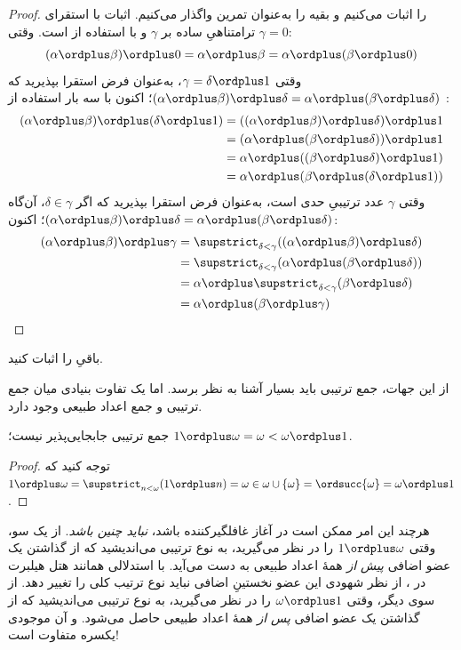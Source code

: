 \documentclass[../../../include/open-logic-section]{subfiles}
\begin{document}
\begin{proof}
 را اثبات می‌کنیم و بقیه را به‌عنوان تمرین
واگذار می‌کنیم. اثبات با استقرای ترامتناهیِ ساده بر $\gamma$ و با
استفاده از  است. وقتی $\gamma = 0$:
\[
(\alpha \ordplus  \beta) \ordplus  0 = \alpha \ordplus  \beta  = \alpha \ordplus  (\beta \ordplus  0)
\]
وقتی $\gamma = \delta\ordplus 1$، به‌عنوان فرض استقرا بپذیرید که
$(\alpha \ordplus \beta) \ordplus \delta =
\alpha \ordplus (\beta \ordplus \delta)$؛ اکنون با سه بار استفاده
از :
\begin{align*}
	(\alpha \ordplus  \beta) \ordplus  (\delta \ordplus  1) & = ((\alpha \ordplus  \beta) \ordplus  \delta)\ordplus 1\\
	& = (\alpha \ordplus  (\beta \ordplus  \delta)) \ordplus  1\\
	& = \alpha \ordplus  ((\beta \ordplus  \delta)\ordplus 1)\\
	& = \alpha \ordplus  (\beta \ordplus  (\delta\ordplus 1))
\end{align*}
وقتی $\gamma$ عدد ترتیبیِ حدی است، به‌عنوان فرض استقرا بپذیرید که
اگر $\delta \in \gamma$، آن‌گاه
$(\alpha \ordplus \beta) \ordplus \delta =
\alpha \ordplus (\beta \ordplus \delta)$؛ اکنون:
\begin{align*}
	(\alpha \ordplus  \beta) \ordplus  \gamma & = \supstrict_{\delta < \gamma}((\alpha \ordplus  \beta) \ordplus  \delta) \\
	&= \supstrict_{\delta < \gamma}(\alpha \ordplus  (\beta \ordplus  \delta))\\
	&= \alpha \ordplus  \supstrict_{\delta < \gamma}(\beta \ordplus  \delta)\\
	& = \alpha \ordplus  (\beta \ordplus  \gamma)
\end{align*}
\end{proof}

\begin{prob}
باقیِ  را
اثبات کنید.
\end{prob}

از این جهات، جمع ترتیبی باید بسیار آشنا به نظر برسد. اما یک تفاوت
بنیادی میان جمع ترتیبی و جمع اعداد طبیعی وجود دارد.

\begin{prop}
جمع ترتیبی {جابجایی‌پذیر نیست}؛
$1 \ordplus \omega = \omega < \omega \ordplus 1$.
\end{prop}

\begin{proof}
توجه کنید که
$1 \ordplus \omega = \supstrict_{n < \omega} (1 \ordplus n)
= \omega \in \omega \cup \{\omega\} = \ordsucc{\omega} = \omega
\ordplus 1$.
\end{proof}
\noindent
هرچند این امر ممکن است در آغاز غافلگیرکننده باشد، \emph{نباید چنین
باشد}. از یک سو، وقتی $1 \ordplus \omega$ را در نظر می‌گیرید، به نوع
ترتیبی می‌اندیشید که از گذاشتن یک عضو اضافی \emph{پیش از} همهٔ اعداد
طبیعی به دست می‌آید. با استدلالی همانند هتل هیلبرت در
، از نظر شهودی این عضو نخستینِ
اضافی نباید نوع ترتیب کلی را تغییر دهد. از سوی دیگر، وقتی
$\omega \ordplus 1$ را در نظر می‌گیرید، به نوع ترتیبی می‌اندیشید که
از گذاشتن یک عضو اضافی \emph{پس از} همهٔ اعداد طبیعی حاصل می‌شود.
و آن موجودی یکسره متفاوت است!
\end{document}
